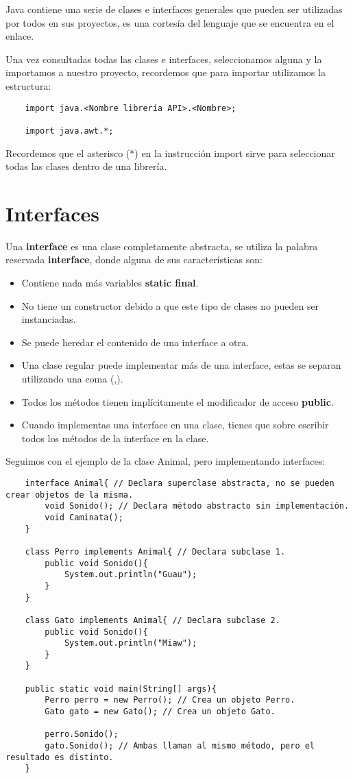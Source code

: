 Java contiene una serie de clases e interfaces generales que pueden ser utilizadas por todos en sus proyectos, es una cortesía del lenguaje que se encuentra en el enlace.

Una vez consultadas todas las clases e interfaces, seleccionamos alguna y la importamos a nuestro proyecto, recordemos que para importar utilizamos la estructura:
\begin{lstlisting}
    import java.<Nombre librería API>.<Nombre>;

    import java.awt.*;
\end{lstlisting}

Recordemos que el asterisco (*) en la instrucción import sirve para seleccionar todas las clases dentro de una librería.



\section{Interfaces}

Una \textbf{interface} es una clase completamente abstracta, se utiliza la palabra reservada \textbf{interface}, donde alguna de sus características son:
\begin{itemize}
    \item Contiene nada más variables \textbf{static final}.
    \item No tiene un constructor debido a que este tipo de clases no pueden ser instanciadas.
    \item Se puede heredar el contenido de una interface a otra.
    \item Una clase regular puede implementar más de una interface, estas se separan utilizando una coma (,).
    \item Todos los métodos tienen implícitamente el modificador de acceso \textbf{public}.
    \item Cuando implementas una interface en una clase, tienes que sobre escribir todos los métodos de la interface en la clase.
\end{itemize}

Seguimos con el ejemplo de la clase Animal, pero implementando interfaces:
\begin{lstlisting}
    interface Animal{ // Declara superclase abstracta, no se pueden crear objetos de la misma.
        void Sonido(); // Declara método abstracto sin implementación.
        void Caminata();
    }
    
    class Perro implements Animal{ // Declara subclase 1.
        public void Sonido(){
            System.out.println("Guau");
        }
    }
    
    class Gato implements Animal{ // Declara subclase 2.
        public void Sonido(){
            System.out.println("Miaw");
        }
    }
    
    public static void main(String[] args){
        Perro perro = new Perro(); // Crea un objeto Perro.
        Gato gato = new Gato(); // Crea un objeto Gato.
        
        perro.Sonido();
        gato.Sonido(); // Ambas llaman al mismo método, pero el resultado es distinto.
    }
\end{lstlisting}




